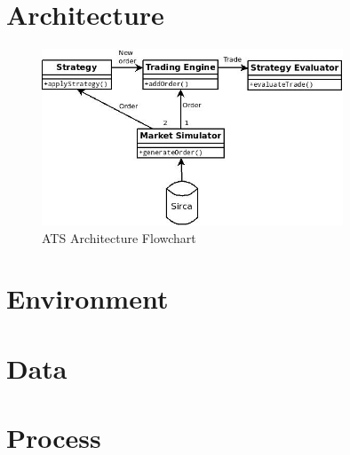 \documentclass{article}
\begin{document}
\maketitle


\section{Architecture}

\begin{figure}
\centering
\includegraphics[width=0.8\textwidth]{architecture}
\caption{ATS Architecture Flowchart}
\label{fig:architecture}
\end{figure}

\section{Environment}


\section{Data}


\section{Process}

\end{document}
